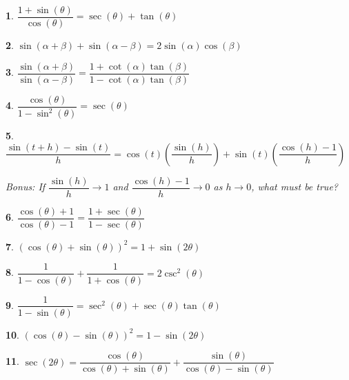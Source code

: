 \documentclass{amsbook}
\newtheorem{exc}{}
\newenvironment{ex}{\begin{exc}\normalfont}{\end{exc}}
\numberwithin{section}{chapter}
\numberwithin{equation}{chapter}
\begin{document}
\begin{ex}
	$\dfrac{1+ \sin(\theta)}{\cos(\theta)} = \sec(\theta) + \tan(\theta)$
\end{ex}

\begin{ex}
	 $\sin(\alpha + \beta) + \sin(\alpha - \beta) = 2\sin(\alpha)\cos(\beta)$ 
\end{ex}


\begin{ex}
	$\dfrac{\sin(\alpha+\beta)}{\sin(\alpha-\beta)} = \dfrac{1+\cot(\alpha) \tan(\beta)}{1 - \cot(\alpha) \tan(\beta)}$ 
\end{ex}


\begin{ex}
	$\dfrac{\cos(\theta)}{1 - \sin^{2}(\theta)} = \sec(\theta)$
\end{ex}

\begin{ex}
	$\dfrac{\sin(t + h) - \sin(t)}{h} = \cos(t) \left(\dfrac{\sin(h)}{h} \right) + \sin(t) \left( \dfrac{\cos(h) - 1}{h} \right)$
	
	Bonus: If $\dfrac{\sin(h)}{h} \to 1$ and $\dfrac{\cos(h) - 1}{h} \to 0$ as $h\to 0$, what must be true?
\end{ex}


\begin{ex}
	$\dfrac{\cos(\theta) + 1}{\cos(\theta) - 1} = \dfrac{1 + \sec(\theta)}{1 - \sec(\theta)}$
\end{ex}


\begin{ex}
	$(\cos(\theta) + \sin(\theta))^2 = 1 + \sin(2\theta)$ 
\end{ex}

\begin{ex}
	 $\dfrac{1}{1-\cos(\theta)} + \dfrac{1}{1+\cos(\theta)} = 2\csc^{2}(\theta)$
\end{ex}


\begin{ex}
	$\dfrac{1}{1-\sin(\theta)} = \sec^{2}(\theta) + \sec(\theta) \tan(\theta)$
\end{ex}


\begin{ex}
	 $(\cos(\theta) - \sin(\theta))^2 = 1 - \sin(2\theta)$
\end{ex}


\begin{ex}
	 $\sec(2\theta) = \dfrac{\cos(\theta)}{\cos(\theta) + \sin(\theta)} + \dfrac{\sin(\theta)}{\cos(\theta)-\sin(\theta)}$ 
\end{ex}
\end{document}
